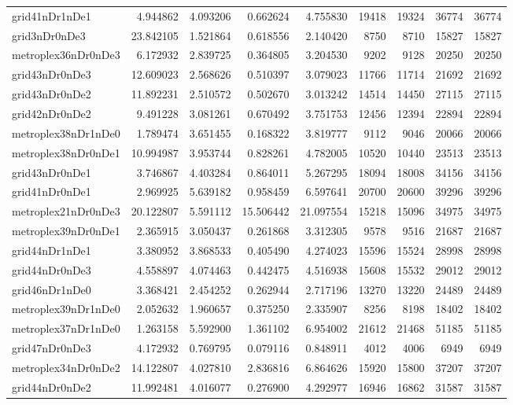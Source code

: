 \begin{longtable}{|l|r|r|r|r|r|r|r|r|}
grid41nDr1nDe1 & 4.944862 & 4.093206 & 0.662624 & 4.755830 & 19418 & 19324 & 36774 & 36774 \\
grid3nDr0nDe3 & 23.842105 & 1.521864 & 0.618556 & 2.140420 & 8750 & 8710 & 15827 & 15827 \\
metroplex36nDr0nDe3 & 6.172932 & 2.839725 & 0.364805 & 3.204530 & 9202 & 9128 & 20250 & 20250 \\
grid43nDr0nDe3 & 12.609023 & 2.568626 & 0.510397 & 3.079023 & 11766 & 11714 & 21692 & 21692 \\
grid43nDr0nDe2 & 11.892231 & 2.510572 & 0.502670 & 3.013242 & 14514 & 14450 & 27115 & 27115 \\
grid42nDr0nDe2 & 9.491228 & 3.081261 & 0.670492 & 3.751753 & 12456 & 12394 & 22894 & 22894 \\
metroplex38nDr1nDe0 & 1.789474 & 3.651455 & 0.168322 & 3.819777 & 9112 & 9046 & 20066 & 20066 \\
metroplex38nDr0nDe1 & 10.994987 & 3.953744 & 0.828261 & 4.782005 & 10520 & 10440 & 23513 & 23513 \\
grid43nDr0nDe1 & 3.746867 & 4.403284 & 0.864011 & 5.267295 & 18094 & 18008 & 34156 & 34156 \\
grid41nDr0nDe1 & 2.969925 & 5.639182 & 0.958459 & 6.597641 & 20700 & 20600 & 39296 & 39296 \\
metroplex21nDr0nDe3 & 20.122807 & 5.591112 & 15.506442 & 21.097554 & 15218 & 15096 & 34975 & 34975 \\
metroplex39nDr0nDe1 & 2.365915 & 3.050437 & 0.261868 & 3.312305 & 9578 & 9516 & 21687 & 21687 \\
grid44nDr1nDe1 & 3.380952 & 3.868533 & 0.405490 & 4.274023 & 15596 & 15524 & 28998 & 28998 \\
grid44nDr0nDe3 & 4.558897 & 4.074463 & 0.442475 & 4.516938 & 15608 & 15532 & 29012 & 29012 \\
grid46nDr1nDe0 & 3.368421 & 2.454252 & 0.262944 & 2.717196 & 13270 & 13220 & 24489 & 24489 \\
metroplex39nDr1nDe0 & 2.052632 & 1.960657 & 0.375250 & 2.335907 & 8256 & 8198 & 18402 & 18402 \\
metroplex37nDr1nDe0 & 1.263158 & 5.592900 & 1.361102 & 6.954002 & 21612 & 21468 & 51185 & 51185 \\
grid47nDr0nDe3 & 4.172932 & 0.769795 & 0.079116 & 0.848911 & 4012 & 4006 & 6949 & 6949 \\
metroplex34nDr0nDe2 & 14.122807 & 4.027810 & 2.836816 & 6.864626 & 15920 & 15800 & 37207 & 37207 \\
grid44nDr0nDe2 & 11.992481 & 4.016077 & 0.276900 & 4.292977 & 16946 & 16862 & 31587 & 31587 \\

\end{longtable}
